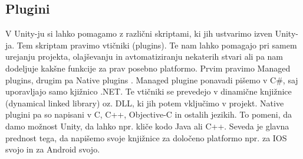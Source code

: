 {\color{indiagreen}\subsection{Plugini}}
V Unity-ju si lahko pomagamo z različni skriptami, ki jih ustvarimo izven Unity-ja. Tem skriptam pravimo vtičniki (plugins). Te nam lahko pomagajo pri samem urejanju projekta, olajševanju in avtomatiziranju nekaterih stvari ali pa nam dodeljuje kakšne funkcije za prav posebno platformo. Prvim pravimo Managed plugins, drugim pa Native plugins \cite{manual}. Managed plugine ponavadi pišemo v C\#, saj uporavljajo samo kjižnico .NET. Te vtičniki se prevedejo v dinamične knjižnice (dynamical linked library) oz. DLL, ki jih potem vključimo v projekt. Native plugini pa so napisani v C, C++, Objective-C in ostalih jezikih. To pomeni, da damo možnost Unity, da lahko npr. kliče kodo Java ali C++. Seveda je glavna prednost tega, da napišemo svoje knjižnice za določeno platformo npr. za IOS svojo in za Android svojo. 